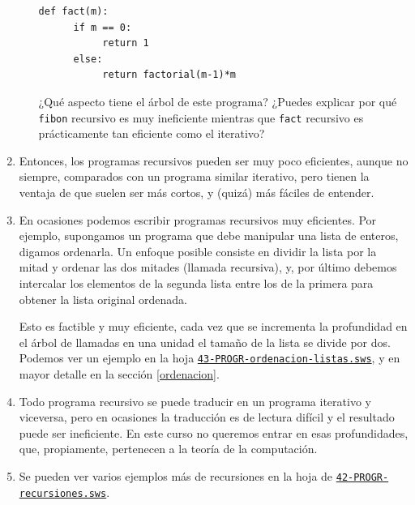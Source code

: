 \begin{enumerate}
\begin{enumerate}
{}\parindent\begin{minipage}{.85\textwidth}\rm\small
\begin{lstlisting}[columns=spaceflexible]
def fact(m):
      if m == 0:
           return 1
      else:
           return factorial(m-1)*m

\end{lstlisting}
\end{minipage}

¿Qué aspecto tiene el árbol de este programa? ¿Puedes explicar por qué
{\tt fibon} recursivo es muy ineficiente mientras que  {\tt fact} recursivo es
prácticamente tan eficiente como el iterativo?

\end{enumerate}

\item Entonces, los programas recursivos pueden  ser muy poco eficientes, aunque
no siempre, 
comparados con un programa similar iterativo,  pero
tienen la ventaja de que suelen ser más cortos, y (quizá) más fáciles de
entender. 


\item  En ocasiones podemos escribir programas recursivos muy eficientes. Por
ejemplo, supongamos un programa que debe manipular una lista de enteros, digamos
ordenarla. Un enfoque posible consiste en dividir la lista por la mitad y
ordenar las dos mitades (llamada recursiva), y, por último debemos  
intercalar los elementos de la segunda lista entre los de la primera para
obtener la lista original ordenada. 

Esto es factible y muy eficiente, cada vez que se incrementa la profundidad en
el árbol de llamadas en una unidad el tamaño de la lista se divide por dos. 
Podemos ver  un ejemplo en la hoja
\href{http://sage.mat.uam.es:8888/home/pub/7/}{\tt 43-PROGR-ordenacion-listas.sws}, y en mayor detalle en la secci\'on \ref{ordenacion}.

\item Todo programa recursivo se puede traducir en un programa iterativo y
viceversa, pero en ocasiones la traducci\'on es de lectura difícil  y el
resultado puede ser ineficiente.  En este curso no queremos entrar en esas
profundidades, que,  propiamente,  pertenecen a  la teoría de la computación.


\item Se pueden ver varios ejemplos m\'as de recursiones en la hoja de {\sage} \href{http://sage.mat.uam.es:8888/home/pub/6/}{\tt 42-PROGR-recursiones.sws}.



\end{enumerate}




